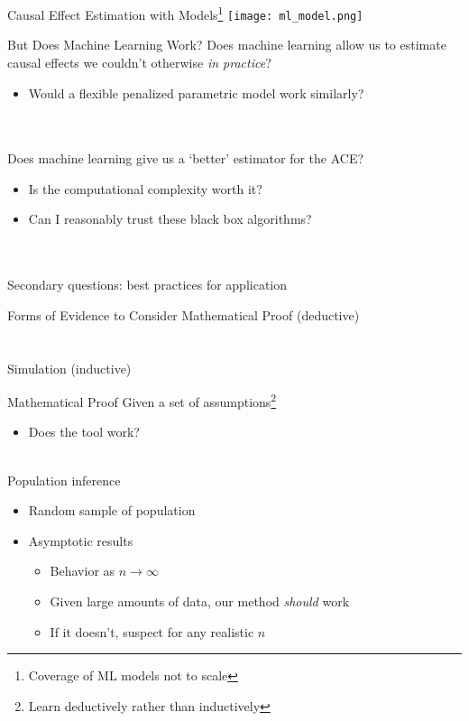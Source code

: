 \documentclass{beamer}
\begin{document}
\begin{frame}{Causal Effect Estimation with Models\footnote[frame]{Coverage of ML models not to scale}}
	\centering
	\texttt{[image: ml\_model.png]}
\end{frame}

\begin{frame}{But Does Machine Learning Work?}
	Does machine learning allow us to estimate causal effects we couldn't otherwise \textit{in practice}?
	\begin{itemize}
		\item Would a flexible penalized parametric model work similarly?
	\end{itemize}
	~\\~\\
	Does machine learning give us a `better' estimator for the ACE?
	\begin{itemize}
		\item Is the computational complexity worth it?
		\item Can I reasonably trust these black box algorithms?
	\end{itemize}
	~\\~\\
	Secondary questions: best practices for application
\end{frame}

\begin{frame}{Forms of Evidence to Consider}
	\centering\Large
	Mathematical Proof (deductive)
	\\~\\~\\
	Simulation (inductive)
\end{frame}

\begin{frame}{Mathematical Proof}
	Given a set of assumptions\footnote[frame]{Learn deductively rather than inductively}
	\begin{itemize}
		\item Does the tool work?
	\end{itemize}~\\
	Population inference
	\begin{itemize}
		\item Random sample of population
		\item Asymptotic results
		\begin{itemize}
			\item Behavior as $n \rightarrow \infty$
			\item Given large amounts of data, our method \textit{should} work
			\item If it doesn't, suspect for any realistic $n$
		\end{itemize}
	\end{itemize}
\end{frame}
\end{document}

